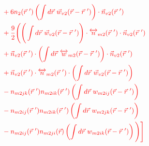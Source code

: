 \documentclass[double,12pt]{revtex4-2}
\begin{document}
\begin{align}
     &\color{red}+6n_2(\vec r~')\left(\int d\vec r ~\vec 
     w_{v2}(\vec r-\vec r~')\right)\cdot \vec n_{v2}(\vec r~')\nonumber \\
     &\color{red}+\frac{9}{2}\Bigg(\Bigg(\int d\vec r ~\vec w_{v2}(\vec r-\vec r~')
     \Bigg)
     \cdot \overleftrightarrow n_{m2}(\vec r~')\cdot \vec n_{v2}(\vec r~') 
     \nonumber\\
     &\color{red}+\vec n_{v2}(\vec r~')\cdot \left(\int d\vec r ~\overleftrightarrow 
     w_{m2}(\vec r-\vec r~')\right) \cdot \vec n_{v2}( \vec r~') \nonumber\\    
     &\color{red}+\vec n_{v2}( \vec r~')\cdot \overleftrightarrow n_{m2}(\vec r~')
     \cdot \left(\int d\vec r ~\vec w_{v2}(\vec r-\vec r~')\right)
     \nonumber\\
     &\color{red}-n_{m2jk}(\vec r~')n_{m2ik}(\vec r~')\left(\int d\vec r~w_{m2ij}
     (\vec r-\vec r~')\right) \nonumber \\
     &\color{red}-n_{m2ij}(\vec r~')n_{m2ik}(\vec r~')\left(\int d\vec r~w_{m2jk}
     (\vec r-\vec r~')\right)\nonumber \\
     &\color{red}-n_{m2ij}(\vec r~')n_{m2ji}(\vec r)\left(\int d\vec r~w_{m2ik}
     (\vec r-\vec r~')\right)     
     \Bigg)\Bigg] 
\end{align} 
\end{document}
